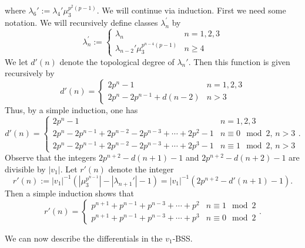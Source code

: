 where $\lambda_6':= \lambda_4'\mu_3^{p^2(p-1)}$. We will continue via induction. First we need some notation. We will recursively define classes $\lambda_n^{\prime}$ by 
\[
\lambda_n^{\prime}:= \begin{cases}
	\lambda_n & n=1,2,3\\
	\lambda_{n-2}'\mu_3^{p^{n-4}(p-1)} & n\geq 4
\end{cases}
\]
We let $d'(n)$ denote the topological degree of $\lambda_n'$. Then this function is given recursively by 
\[
d'(n) = \begin{cases}
	2p^n-1 & n=1,2,3\\
	2p^n-2p^{n-1}+d(n-2) & n>3
\end{cases}
\]
Thus, by a simple induction, one has 
\[
d'(n) = \begin{cases}
	2p^n-1 & n=1,2,3\\
	2p^n-2p^{n-1}+2p^{n-2}-2p^{n-3}+\cdots + 2p^2-1 & n\equiv 0\mod 2,\, n>3\\
	2p^n-2p^{n-1}+ 2p^{n-2}-2p^{n-3}+\cdots + 2p^3-1& n\equiv 1\mod 2, \, n>3
\end{cases}.
\]
Observe that the integers $2p^{n+2}-d(n+1)-1$ and $2p^{n+2}-d(n+2)-1$ are divisible by $|v_1|$. Let $r'(n)$ denote the integer 
\[
r'(n):=|v_1|^{-1}(|\mu_3^{p^{n-1}}|-|\lambda_{n+1}'|-1)=|v_1|^{-1}(2p^{n+2}-d'(n+1)-1).
\] 
Then a simple induction shows that 
\[
r'(n) = \begin{cases}
	p^{n+1}+p^{n-1}+p^{n-3} +\cdots + p^2 & n\equiv 1 \mod 2\\
	p^{n+1}+p^{n-1}+p^{n-3}+\cdots + p^3 & n\equiv 0 \mod 2
\end{cases}.
\]



We can now describe the differentials in the $v_1$-BSS. 



